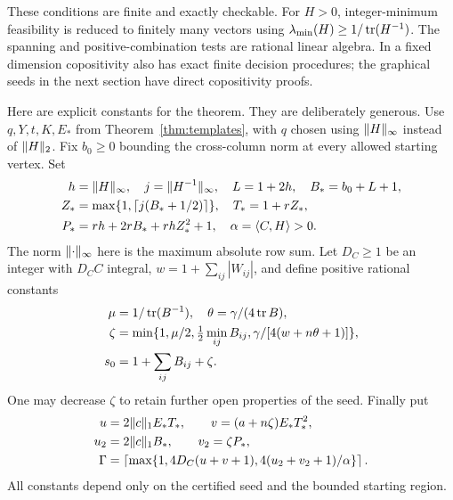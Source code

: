 \documentclass[11pt]{article}
\theoremstyle{definition}\newtheorem{definition}[theorem]{Definition}
\theoremstyle{remark}\newtheorem{remark}[theorem]{Remark}
\begin{document}
These conditions are finite and exactly checkable. For $H>0$, integer-minimum feasibility is reduced to finitely many vectors using $\lambda_{\min}(H)\ge1/\operatorname{tr}(H^{-1})$. The spanning and positive-combination tests are rational linear algebra. In a fixed dimension copositivity also has exact finite decision procedures; the graphical seeds in the next section have direct copositivity proofs.

Here are explicit constants for the theorem. They are deliberately generous. Use $q,Y,t,K,E_*$ from Theorem~\ref{thm:templates}, with $q$ chosen using $\lVert H\rVert_\infty$ instead of $\lVert H\rVert_2$. Fix $b_0\ge0$ bounding the cross-column norm at every allowed starting vertex. Set
\[
 \begin{split}
 h&=\lVert H\rVert_\infty,\quad j=\lVert H^{-1}\rVert_\infty,\quad
 L=1+2h,\quad B_*=b_0+L+1,\\
 Z_*&=\max\{1,\lceil j(B_*+1/2)\rceil\},\quad T_*=1+rZ_*,\\
 P_*&=rh+2rB_*+rhZ_*^2+1,\quad
 \alpha=\langle C,H\rangle>0.
 \end{split}
\]
The norm $\lVert \cdot\rVert_\infty$ here is the maximum absolute row sum. Let $D_C\ge1$ be an integer with $D_CC$ integral, $w=1+\sum_{ij}|W_{ij}|$, and define positive rational constants
\begin{equation}\label{eq:robustconstants}
 \begin{split}
 \mu&=1/\operatorname{tr}(B^{-1}),\quad \theta=\gamma/(4\operatorname{tr} B),\\
 \zeta&=\min\{1,\mu/2,\tfrac12\min_{ij}B_{ij},
                    \gamma/[4(w+n\theta+1)]\},\\
 s_0&=1+\sum_{ij}B_{ij}+\zeta.
 \end{split}
\end{equation}
One may decrease $\zeta$ to retain further open properties of the seed. Finally put
\[
 \begin{split}
 u&=2\lVert c\rVert_1 E_*T_*,\qquad v=(a+n\zeta)E_*T_*^2,\\
 u_2&=2\lVert c\rVert_1 B_*,\qquad v_2=\zeta P_*,\\
 \Gamma&=\left\lceil\max\{1,4D_C(u+v+1),4(u_2+v_2+1)/\alpha\}\right\rceil.
 \end{split}
\]
All constants depend only on the certified seed and the bounded starting region.
\end{document}
